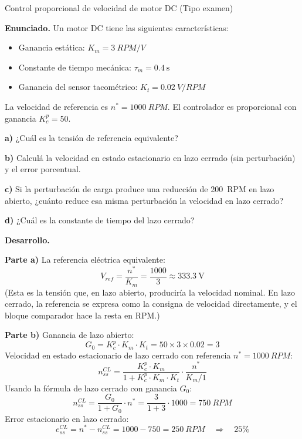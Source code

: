 \begin{ejercicioresuelto}{Control proporcional de velocidad de motor DC (Tipo examen)}

\textbf{Enunciado.} Un motor DC tiene las siguientes características:
\begin{itemize}
  \item Ganancia estática: $K_m = \SI{3}{RPM/V}$
  \item Constante de tiempo mecánica: $\tau_m = \SI{0.4}{\second}$
  \item Ganancia del sensor tacométrico: $K_t = \SI{0.02}{V/RPM}$
\end{itemize}
La velocidad de referencia es $n^* = \SI{1000}{RPM}$.
El controlador es proporcional con ganancia $K_c^p = 50$.

\textbf{a)} ¿Cuál es la tensión de referencia equivalente?

\textbf{b)} Calculá la velocidad en estado estacionario en lazo cerrado
(sin perturbación) y el error porcentual.

\textbf{c)} Si la perturbación de carga produce una reducción de
\SI{200}{RPM} en lazo abierto, ¿cuánto reduce esa misma perturbación
la velocidad en lazo cerrado?

\textbf{d)} ¿Cuál es la constante de tiempo del lazo cerrado?

\textbf{Desarrollo.}

\textbf{Parte a)} La referencia eléctrica equivalente:
\begin{equation*}
  V_{ref} = \frac{n^*}{K_m} = \frac{1000}{3} \approx \SI{333.3}{\volt}
\end{equation*}
(Esta es la tensión que, en lazo abierto, produciría la velocidad nominal.
En lazo cerrado, la referencia se expresa como la consigna de velocidad
directamente, y el bloque comparador hace la resta en RPM.)

\textbf{Parte b)} Ganancia de lazo abierto:
\begin{equation*}
  G_0 = K_c^p \cdot K_m \cdot K_t = 50 \times 3 \times 0.02 = 3
\end{equation*}
Velocidad en estado estacionario de lazo cerrado con referencia $n^* = \SI{1000}{RPM}$:
\begin{equation*}
  n_{ss}^{CL} = \frac{K_c^p \cdot K_m}{1 + K_c^p \cdot K_m \cdot K_t} \cdot
  \frac{n^*}{K_m/1}
\end{equation*}
Usando la fórmula de lazo cerrado con ganancia $G_0$:
\begin{equation*}
  n_{ss}^{CL} = \frac{G_0}{1 + G_0} \cdot n^* = \frac{3}{1+3} \cdot 1000
  = \SI{750}{RPM}
\end{equation*}
Error estacionario en lazo cerrado:
\begin{equation*}
  e_{ss}^{CL} = n^* - n_{ss}^{CL} = 1000 - 750 = \SI{250}{RPM}
  \quad \Rightarrow \quad 25\%
\end{equation*}


\end{ejercicioresuelto}
